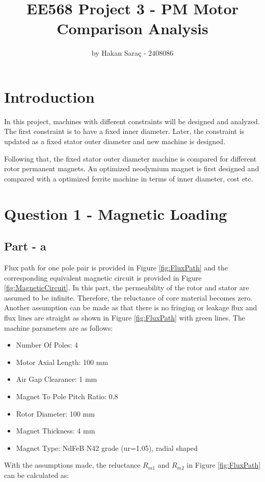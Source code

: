 \documentclass{article}
\title{\myfont EE568 Project 3 - PM Motor Comparison Analysis }
\author{\hisfont by Hakan Saraç - 2408086}
\date{}
\begin{document}
\maketitle

\newpage

\tableofcontents
\newpage

\section*{Introduction}
In this project, machines with different constraints will be designed and analyzed. The first constraint is to have a fixed inner diameter. Later, the constraint is updated as a fixed stator outer diameter and new machine is designed. 


Following that, the fixed stator outer diameter machine is compared for different rotor permanent magnets. An optimized neodymium magnet is first designed and compared with a optimized ferrite machine in terms of inner diameter, cost etc.
\section{Question 1 - Magnetic Loading}
\subsection{Part - a}

Flux path for one pole pair is provided in Figure \ref{fig:FluxPath} and the corresponding equivalent magnetic circuit is provided in Figure \ref{fig:MagneticCircuit}. In this part, the permeability of the rotor and stator are assumed to be infinite. Therefore, the reluctance of core material becomes zero. Another assumption can be made as that there is no fringing or leakage flux and flux lines are straight as shown in Figure \ref{fig:FluxPath} with green lines. \newline
The machine parameters are as follows:
\begin{itemize}
    \item Number Of Poles: 4
    \item Motor Axial Length: 100 mm
    \item Air Gap Clearance: 1 mm
    \item Magnet To Pole Pitch Ratio: 0.8
    \item Rotor Diameter: 100 mm
    \item Magnet Thickness: 4 mm
    \item Magnet Type: NdFeB N42 grade (ur=1.05), radial shaped
\end{itemize} 
\bigskip
\noindent With the assumptions made, the reluctance $R_{m1}$ and $R_{m2}$ in Figure \ref{fig:FluxPath} can be calculated as:
\end{document}
